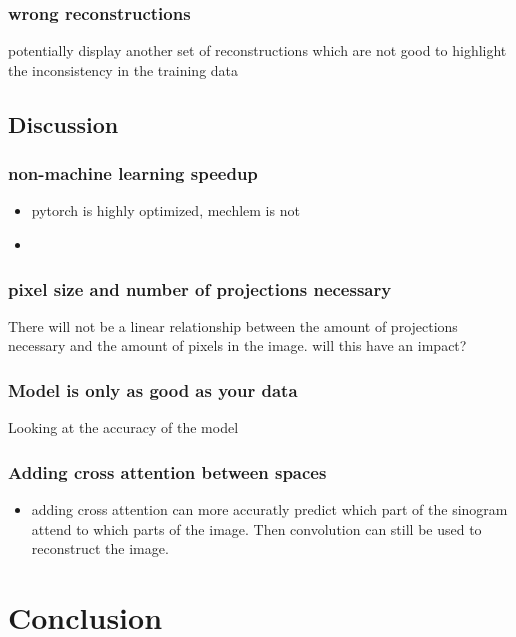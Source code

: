 \documentclass[9pt,Preprint]{lapreprint}
\begin{document}
\subsubsection{wrong reconstructions}

potentially display another set of reconstructions which are not good to highlight the inconsistency in the training data

\subsection{Discussion}

\subsubsection{non-machine learning speedup}

\begin{itemize}
\item pytorch is highly optimized, mechlem is not
\item
\end{itemize}

\subsubsection{pixel size and number of projections necessary}

There will not be a linear relationship between the amount of projections necessary and the amount of pixels in the image. will this have an impact?

\subsubsection{Model is only as good as your data}

Looking at the accuracy of the model

\subsubsection{Adding cross attention between spaces}

\begin{itemize}
\item adding cross attention can more accuratly predict which part of the sinogram attend to which parts of the image. Then convolution can still be used to reconstruct the image.
\end{itemize}

\section{Conclusion}
\end{document}
